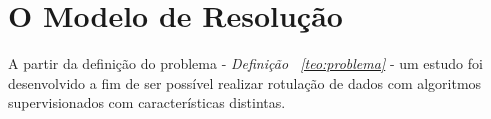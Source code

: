 


\section{O Modelo de Resolução}\label{cap:ferramentas:sec:modeloresolucao}

A partir da definição do problema - \textit{Definição ~\ref{teo:problema}} - um estudo  foi desenvolvido a fim de ser possível realizar rotulação de dados com  algoritmos supervisionados com características distintas.


